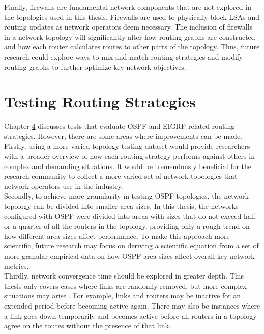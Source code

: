 \documentclass{uiucthesis2021}
\begin{document}
\noindent Finally, firewalls are fundamental network components that are not explored in the topologies used in this thesis. Firewalls are used to physically block LSAs and routing updates as network operators deem necessary. The inclusion of firewalls in a network topology will significantly alter how routing graphs are constructed and how each router calculates routes to other parts of the topology. Thus, future research could explore ways to mix-and-match routing strategies and modify routing graphs to further optimize key network objectives.

\section{Testing Routing Strategies}
\noindent Chapter \hyperref[c4]{4} discusses tests that evaluate OSPF and EIGRP related routing strategies. However, there are some areas where improvements can be made. Firstly, using a more varied topology testing dataset would provide researchers with a broader overview of how each routing strategy performs against others in complex and demanding situations. It would be tremendously beneficial for the research community to collect a more varied set of network topologies that network operators use in the industry. \\

\noindent Secondly, to achieve more granularity in testing OSPF topologies, the network topology can be divided into smaller area sizes. In this thesis, the networks configured with OSPF were divided into areas with sizes that do not exceed half or a quarter of all the routers in the topology, providing only a rough trend on how different area sizes affect performance. To make this approach more scientific, future research may focus on deriving a scientific equation from a set of more granular empirical data on how OSPF area sizes affect overall key network metrics.\\

\noindent Thirdly, network convergence time should be explored in greater depth. This thesis only covers cases where links are randomly removed, but more complex situations may arise \cite{10.1145/2639988.2655736}. For example, links and routers may be inactive for an extended period before becoming active again. There may also be instances where a link goes down temporarily and becomes active before all routers in a topology agree on the routes without the presence of that link. \\
\end{document}
